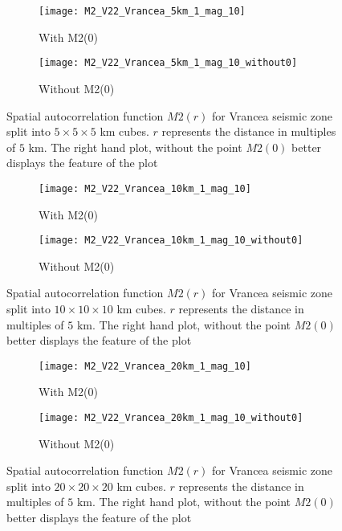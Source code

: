 \begin{figure}[!ht]
\begin{subfigure}{.5\textwidth}
  \centering
  \texttt{[image: M2\_V22\_Vrancea\_5km\_1\_mag\_10]}
  \caption{With M2(0)}
  \label{fig:corr5km}
\end{subfigure}%
\begin{subfigure}{.5\textwidth}
  \centering
  \texttt{[image: M2\_V22\_Vrancea\_5km\_1\_mag\_10\_without0]}
  \caption{Without M2(0)}
  \label{fig:corr5km_noZero}
\end{subfigure}
\caption{Spatial autocorrelation function $M2(r)$ for Vrancea seismic zone split into $5\times5\times5$ km cubes. $r$ represents the distance in multiples of $5$ km. The right hand plot, without the point $M2(0)$ better displays the feature of the plot}
\label{fig:spcorrVrancea5km}
\end{figure}

\begin{figure}[!ht]
\begin{subfigure}{.5\textwidth}
  \centering
  \texttt{[image: M2\_V22\_Vrancea\_10km\_1\_mag\_10]}
  \caption{With M2(0)}
  \label{fig:corr10km}
\end{subfigure}%
\begin{subfigure}{.5\textwidth}
  \centering
  \texttt{[image: M2\_V22\_Vrancea\_10km\_1\_mag\_10\_without0]}
  \caption{Without M2(0)}
  \label{fig:corr10km_noZero}
\end{subfigure}
\caption{Spatial autocorrelation function $M2(r)$ for Vrancea seismic zone split into $10\times10\times10$ km cubes. $r$ represents the distance in multiples of $5$ km. The right hand plot, without the point $M2(0)$ better displays the feature of the plot}
\label{fig:spcorrVrancea10km}
\end{figure}

\begin{figure}[!ht]
\begin{subfigure}{.5\textwidth}
  \centering
  \texttt{[image: M2\_V22\_Vrancea\_20km\_1\_mag\_10]}
  \caption{With M2(0)}
  \label{fig:corr20km}
\end{subfigure}%
\begin{subfigure}{.5\textwidth}
  \centering
  \texttt{[image: M2\_V22\_Vrancea\_20km\_1\_mag\_10\_without0]}
  \caption{Without M2(0)}
  \label{fig:corr20km_noZero}
\end{subfigure}
\caption{Spatial autocorrelation function $M2(r)$ for Vrancea seismic zone split into $20\times20\times20$ km cubes. $r$ represents the distance in multiples of $5$ km. The right hand plot, without the point $M2(0)$ better displays the feature of the plot}
\label{fig:spcorrVrancea20km}
\end{figure}



